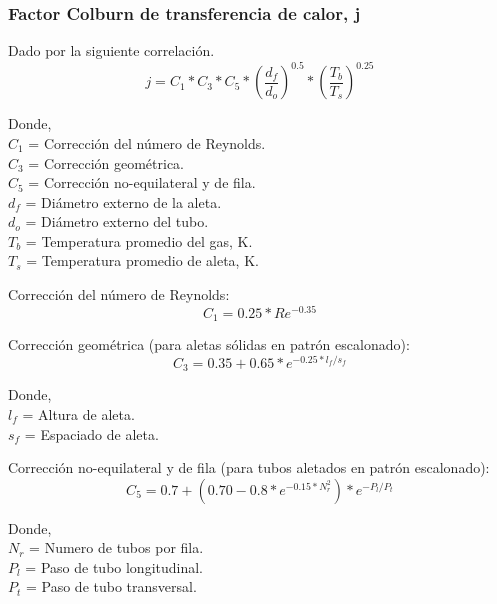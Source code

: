 \subsubsection{Factor Colburn de transferencia de calor, j}
\par Dado por la siguiente correlación.
\begin{equation*}
j = C_1 *C_3 *C_5 *(\dfrac{d_f}{d_o})^{0.5} *(\frac{T_b}{T_s})^{0.25}
\end{equation*}

\par Donde, \\
$C_1$ = Corrección del número de Reynolds. \\
$C_3$ = Corrección geométrica. \\
$C_5$ = Corrección no-equilateral y de fila. \\
$d_f$ = Diámetro externo de la aleta. \\
$d_o$ = Diámetro externo del tubo. \\
$T_b$ = Temperatura promedio del gas, K. \\
$T_s$ = Temperatura promedio de aleta, K.\\

\par Corrección del número de Reynolds:
\begin{equation*}
C_1 = 0.25 *Re^{-0.35}
\end{equation*}

\par Corrección geométrica (para aletas sólidas en patrón escalonado):
\begin{equation*}
C_3 = 0.35 +0.65 *e^{-0.25*l_f/s_f}
\end{equation*}
\par Donde, \\
$l_f$ = Altura de aleta. \\
$s_f$ = Espaciado de aleta.\\

\par Corrección no-equilateral y de fila (para tubos aletados en patrón escalonado):
\begin{equation*}
C_5 = 0.7 +(0.70 -0.8 *e^{-0.15 *N_r^2}) *e^{-P_l/P_t}
\end{equation*}
\par Donde, \\
$N_r$ = Numero de tubos por fila. \\
$P_l$ = Paso de tubo longitudinal.\\
$P_t$ = Paso de tubo transversal. \\

